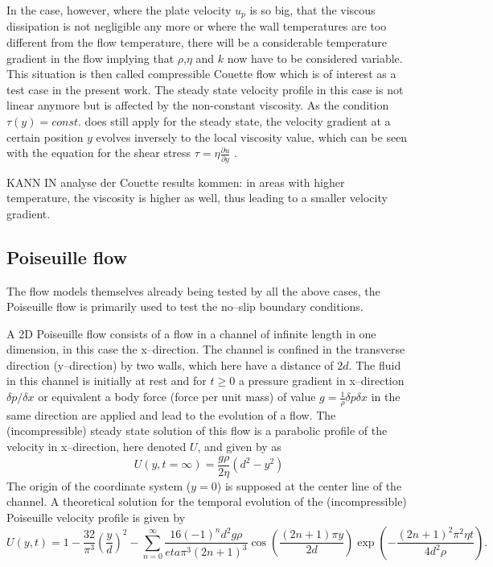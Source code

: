 \documentclass{report}
\begin{document}
In the case, however, where the plate velocity $u_p$ is so big, that the viscous dissipation is not negligible any more or where the wall temperatures are too different from the flow temperature, there will be a considerable temperature gradient in the flow implying that $\rho$,$\eta$ and $k$ now have to be considered variable. This situation is then called compressible Couette flow which is of interest as a test case in the present work.
The steady state velocity profile in this case is not linear anymore but is affected by the non-constant viscosity. As the condition $\tau(y)=const.$ does still apply for the steady state, the velocity gradient at a certain position $y$ evolves inversely to the local viscosity value, which can be seen with the equation for the shear stress $\tau=\eta \frac{\partial u}{\partial y}$ \cite{Anderson2001}. 



KANN IN analyse der Couette results kommen: in areas with higher temperature, the viscosity is higher as well, thus leading to a smaller velocity gradient.


\subsection{Poiseuille flow}
\label{sec:genIntroPoiseuille}
 The flow models themselves already being tested by all the above cases, the Poiseuille flow is primarily used to test the no--slip boundary conditions. 

A 2D Poiseuille flow consists of a flow in a channel of infinite length in one dimension, in this case the x--direction. The channel is confined  in the transverse direction (y--direction) by two walls, which here have a distance of $2d$. The fluid in this channel is initially at rest and for $t\geq0$ a pressure gradient in x--direction $\delta p/\delta x $ or equivalent a body force (force per unit mass) of value $g=\frac{1}{\rho}{\delta p}{\delta x}$ \cite{Sigalotti2003} in the same direction are applied and lead to the evolution of a flow. The (incompressible) steady state solution of this flow is a parabolic profile of the velocity in x--direction, here denoted $U$, and given by \cite{Sigalotti2003} as
\begin{equation}
\label{eq:Poiseuille_steadyState_U}
 U(y,t=\infty)=\frac{g \rho}{2 \eta}(d^2-y^2)
\end{equation}
The origin of the coordinate system ($y=0$) is supposed at the center line of the channel.
A theoretical solution for the temporal evolution of the (incompressible) Poiseuille velocity profile is given by \cite{Sigalotti2003}
\begin{equation}
\label{eq:Poiseuille_Series}
 U(y,t)=1-\frac{32}{\pi^3}\left(\frac{y}{d}\right)^2 -\sum_{n=0}^\infty \frac{16(-1)^n d^2 g \rho}{eta \pi^3 (2 n +1)^3}\cos \left(\frac{(2n+1)\pi y}{2 d} \right)\exp \left(- \frac{(2n+1)^2\pi^2\eta t}{4d^2\rho} \right).
\end{equation}
 
\end{document}
